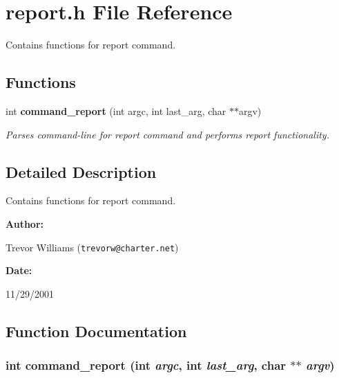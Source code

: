 \section{report.h File Reference}
\label{report_8h}
Contains functions for report command. 


\subsection*{Functions}
\begin{CompactItemize}
\item 
int {\bf command\_\-report} (int argc, int last\_\-arg, char $\ast$$\ast$argv)
\begin{CompactList}\small\item\em Parses command-line for report command and performs report functionality.\item\end{CompactList}\end{CompactItemize}


\subsection{Detailed Description}
Contains functions for report command.



\begin{Desc}
\item[{\bf Author: }]\par
Trevor Williams ({\tt trevorw@charter.net}) \end{Desc}
\begin{Desc}
\item[{\bf Date: }]\par
11/29/2001

\end{Desc}


\subsection{Function Documentation}
\subsubsection{\setlength{\rightskip}{0pt plus 5cm}int command\_\-report (int {\em argc}, int {\em last\_\-arg}, char $\ast$$\ast$ {\em argv})}\label{report_8h_a0}


